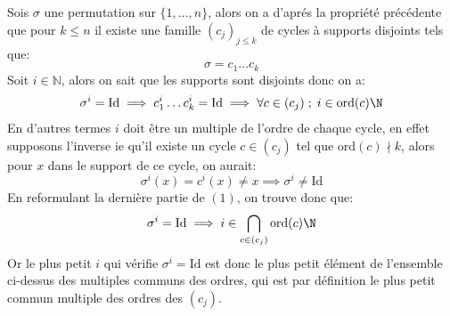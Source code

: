 \documentclass{report}
\begin{document}
      \subsection*{}
         Sois $\sigma$ une permutation sur $\{1, \ldots, n\}$, alors on a d'aprés la propriété précédente que pour \(k \leq n\) il existe une famille \((c_j)_{j \leq k}\) de cycles à supports disjoints tels que:
         $$
            \sigma = c_1 \ldots c_k
         $$
         Soit $i\in \mathbb{N}$, alors on sait que les supports sont disjoints donc on a:
         \begin{align}
            \sigma^i = \text{Id} \implies c_1^i \ldots c_k^i = \text{Id} \implies \forall c \in (c_j) \; ; \; i \in \text{ord}(c)\N
         \end{align}
         En d'autres termes \(i\) doit être un multiple de l'ordre de chaque cycle, en effet supposons l'inverse ie qu'il existe un cycle \(c \in (c_j)\) tel que \(\text{ord}(c) \nmid k\), alors pour \(x\) dans le support de ce cycle, on aurait:
         \[
            \sigma^i(x) = c^i(x) \neq x \implies \sigma^i \neq \text{Id}
         \]
         En reformulant la dernière partie de \((1)\), on trouve donc que:
         \[
            \sigma^i = \text{Id} \implies i \in \bigcap_{c \in (c_j)} \text{ord}(c)\N
         \]
         Or le plus petit \(i\) qui vérifie \(\sigma^i = \text{Id}\) est donc le plus petit élément de l'ensemble ci-dessus des multiples communs des ordres, qui est par définition le plus petit commun multiple des ordres des \((c_j)\).    
\end{document}
